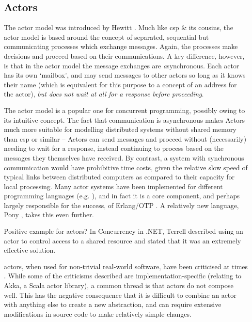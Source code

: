 \subsection{\label{subsec:actors}Actors}
The \gls{actor} \cite{Agha1986} model was introduced by Hewitt \cite{Hewitt1973}.  Much like \gls{csp} \& its cousins, the \gls{actor} model is based around the concept of separated, sequential but communicating processes which exchange messages.  Again, the processes make decisions and proceed based on their communications.  A key difference, however, is that in the \gls{actor} model the message exchanges are \emph{a}synchronous.  Each \gls{actor} has its own `mailbox', and may send messages to other actors so long as it knows their name (which is equivalent for this purpose to a concept of an address for the \gls{actor}), \emph{but does not wait at all for a response before proceeding}.

The \gls{actor} model is a popular one for concurrent programming, possibly owing to its intuitive concept.  The fact that communication is asynchronous makes Actors much more suitable for modelling distributed systems without shared memory than \gls{csp} or similar -- Actors can send messages and proceed without (necessarily) needing to wait for a response, instead continuing to process based on the messages they themselves have received.  By contrast, a system with synchronous communication would have prohibitive time costs, given the relative slow speed of typical links between distributed computers as compared to their capacity for local processing.  Many \gls{actor} systems have been implemented for different programming languages (e.g. \cite{Varela2001,Srinivasan2008,Charousset2016} ), and in fact it is a core component, and perhaps largely responsible for the success, of Erlang/OTP \cite{Armstrong2010,Armstrong2013}.  A relatively new language, Pony \cite{Clebsch2015,Clebsch2017}, takes this even further.
\begin{anfxnote}{Positive example for actors?}
In Concurrency in .NET, Terrell described using an actor to control access to a shared resource and stated that it was an extremely effective solution.
\end{anfxnote}

\Glspl{actor}, when used for non-trivial real-world software, have been criticised at times \cite{Welsh2013,Stucchio2013}.  While some of the criticisms described are implementation-specific (relating to Akka, a Scala \gls{actor} library), a common thread is that \glspl{actor} do not compose well.  This has the negative consequence that it is difficult to combine an \gls{actor} with anything else to create a new abstraction, and can require extensive modifications in source code to make relatively simple changes.

